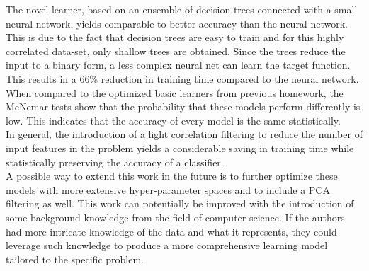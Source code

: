 \documentclass[paper=a4, fontsize=11pt]{scrartcl} %
\begin{document}
The novel learner, based on an ensemble of decision trees connected with a small neural network, yields comparable to better accuracy than the neural network. 
This is due to the fact that decision trees are easy to train and for this highly correlated data-set, only shallow trees are obtained.
Since the trees reduce the input to a binary form, a less complex neural net can learn the target function.
This results in a 66\% reduction in training time compared to the neural network.
\\

When compared to the optimized basic learners from previous homework, the McNemar tests show that the probability that these models perform differently is low. 
This indicates that the accuracy of every model is the same statistically.
\\

In general, the introduction of a light correlation filtering to reduce the number of input features in the problem yields a considerable saving in training time while statistically preserving the accuracy of a classifier.
 \\
 
A possible way to extend this work in the future is to further optimize these models with more extensive hyper-parameter spaces and to include a PCA filtering as well.
This work can potentially be improved with the introduction of some background knowledge from the field of computer science.
If the authors had more intricate knowledge of the data and what it represents, they could leverage such knowledge to produce a more comprehensive learning model tailored to the specific problem.
\end{document}
